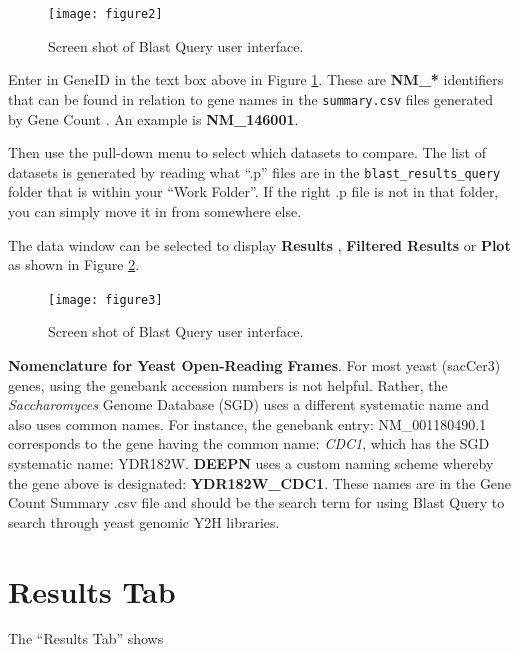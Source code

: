 \documentclass[11pt,fleqn]{book} %
\newcommand{\GeneCount}{{\color{Red} Gene Count }}
\newcommand{\BlastQuery}{{\color{ForestGreen} Blast Query }}
\newcommand{\DEEPN}{\textbf{DEEPN }}
\begin{document}
\begin{figure}[!ht]
    \centering
    \texttt{[image: figure2]}
    \caption{Screen shot of Blast Query user interface.}
    \label{fig:blast_query_screen_shot}
\end{figure}


Enter in GeneID in the text box above in Figure \ref{fig:blast_query_screen_shot}.
These are \textbf{NM\_*} identifiers that can be found in relation to gene names in the \texttt{summary.csv} files generated by \GeneCount. An example is \textbf{NM\_146001}.

Then use the pull-down menu to select which datasets to compare. The list of datasets is generated by reading what ``.p'' files are in the \texttt{blast\_results\_query} folder that is within your ``Work Folder''.  If the right .p file is not in that folder, you can simply move it in from somewhere else.


The data window can be selected to display \textbf{Results} , \textbf{Filtered Results} or \textbf{Plot} as shown in Figure \ref{fig:blast_query_screen_shot2}.

\begin{figure}[!ht]
    \centering
    \texttt{[image: figure3]}
    \caption{Screen shot of Blast Query user interface.}
    \label{fig:blast_query_screen_shot2}
\end{figure}

\begin{remark}
\textbf{Nomenclature for Yeast Open-Reading Frames}.
For most yeast (sacCer3) genes, using the genebank accession numbers is not helpful. Rather, the \emph{Saccharomyces} Genome Database (SGD) uses a different systematic name and also uses common names.  For instance, the genebank entry: NM\_001180490.1 corresponds to the gene having the common name: \emph{CDC1}, which has the SGD systematic name: YDR182W.  \DEEPN uses a custom naming scheme whereby the gene above is designated: \textbf{YDR182W\_CDC1}.  These names are in the \GeneCount Summary .csv file and should be the search term for using \BlastQuery to search through yeast genomic Y2H libraries.  
\end{remark}


\section{Results Tab}

The ``Results Tab'' shows
\end{document}
